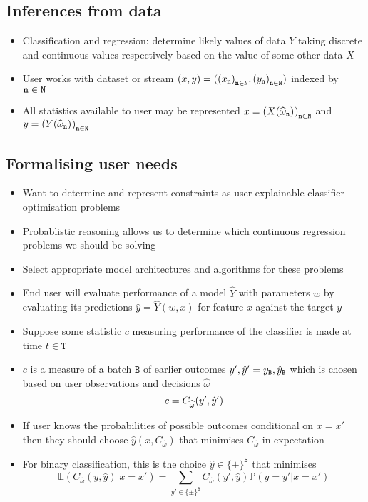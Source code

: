 \documentclass{article}
\newcommand{\TWO}{\{\pm\}}
\newcommand{\Par}{{w}}
\newcommand{\BATCH}{{\texttt{B}}}
\newcommand{\Feature}{{x}}
\newcommand{\Target}{{y}}
\newcommand{\TARGET}{{Y}}
\newcommand{\FEATURE}{{X}}
\newcommand{\FeatureD}{{x'}}
\newcommand{\TargetD}{{y'}}
\newcommand{\TIMES}{{\texttt T}}
\newcommand{\ROWS}{{\texttt N}}
\newcommand{\Phase}{{\omega}}
\newcommand{\PhaseK}{{\widehat\Phase}}
\newcommand{\SCORE}{{C}}
\newcommand{\Score}{{c}}
\newcommand{\Pred}[1][y]{{\hat{#1}}}
\newcommand{\PredD}[1][y]{{\hat{#1}'}}
\newcommand{\PRED}{{\Pred[\TARGET]}}
\begin{document}
\subsection{Inferences from data}
\begin{itemize}
  \item
    Classification and regression: determine likely values of data $\TARGET$ taking discrete and continuous values respectively based on the value of some other data $\FEATURE$
  \item
    User works with dataset or stream $(\Feature,\Target)=(\ENUM[\Feature],\ENUM[\Target])$ indexed by $\ind\in\ROWS$
  \item
    All statistics available to user may be represented $\Feature=\ENUM[\FEATURE(\PhaseK_{\ind})][][\ROWS][\ind\in]$ and $\Target=\ENUM[\TARGET(\PhaseK_{\ind})][][\ROWS][\ind\in]$
\end{itemize}


\subsection{Formalising user needs}
\begin{itemize}
  \item
    Want to determine and represent constraints as user-explainable classifier optimisation problems
  \item
    Probablistic reasoning allows us to determine which continuous regression problems we should be solving
  \item
    Select appropriate model architectures and algorithms for these problems
  \item
    End user will evaluate performance of a model $\PRED$ with parameters $\Par$ by evaluating its predictions $\Pred=\PRED(\Par,\Feature)$ for feature $\Feature$ against the target $\Target$
  \item
    Suppose some statistic $\Score$ measuring performance of the classifier is made at time $t\in\TIMES$
  \item
    $\Score$ is a measure of a batch $\BATCH$ of earlier outcomes $\TargetD,\PredD=\REST[\Target],\REST[\Pred]$ which is chosen based on user observations and decisions $\PhaseK$
      $$
      \Score=\REST[\SCORE][\PhaseK](\TargetD,\PredD)
      $$
  \item
    If user knows the probabilities of possible outcomes conditional on $\Feature=\FeatureD$ then they should choose $\Pred(\Feature,\SCORE_{\PhaseK})$ that minimises $\SCORE_{\PhaseK}$ in expectation
  \item
    For binary classification, this is the choice $\Pred\in\TWO^{\BATCH}$ that minimises
      $$
      \mathbb E(\SCORE_{\PhaseK}(\Target,\Pred)|\Feature=\FeatureD)=\sum_{\TargetD\in\TWO^{\BATCH}}\SCORE_{\PhaseK}(\TargetD,\Pred)\mathbb P(\Target=\TargetD|\Feature=\FeatureD)
      $$
  \end{itemize}
  
\end{document}
